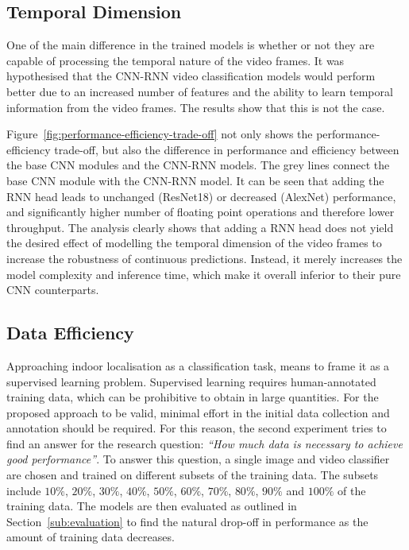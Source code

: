 \documentclass[a4paper]{article}
\begin{document}
  

  \subsection{Temporal Dimension} %
  \label{sub:Temporal Dimension}

  One of the main difference in the trained models is whether or not they are
  capable of processing the temporal nature of the video frames. It was
  hypothesised that the CNN-RNN video classification models would perform better
  due to an increased number of features and the ability to learn temporal
  information from the video frames. The results show that this is not the case.

  Figure~\ref{fig:performance-efficiency-trade-off} not only shows the
  performance-efficiency trade-off, but also the difference in performance and
  efficiency between the base CNN modules and the CNN-RNN models. The grey lines
  connect the base CNN module with the CNN-RNN model. It can be seen that adding
  the RNN head leads to unchanged (ResNet18) or decreased (AlexNet) performance,
  and significantly higher number of floating point operations and therefore
  lower throughput. The analysis clearly shows that adding a RNN head does not
  yield the desired effect of modelling the temporal dimension of the video
  frames to increase the robustness of continuous predictions. Instead, it
  merely increases the model complexity and inference time, which make it
  overall inferior to their pure CNN counterparts.

  \subsection{Data Efficiency} %
  \label{sub:Data Efficiency}

  Approaching indoor localisation as a classification task, means to frame it as
  a supervised learning problem. Supervised learning requires human-annotated
  training data, which can be prohibitive to obtain in large quantities. For the
  proposed approach to be valid, minimal effort in the initial data collection
  and annotation should be required. For this reason, the second experiment
  tries to find an answer for the research question: \textit{ ``How much data
  is necessary to achieve good performance''}. To answer this question, a single
  image and video classifier are chosen and trained on different subsets of the 
  training data. The subsets include $10\%$, $20\%$, $30\%$, $40\%$, $50\%$,
  $60\%$, $70\%$, $80\%$, $90\%$ and $100\%$ of the training data. The models 
  are then evaluated as outlined in Section~\ref{sub:evaluation} to find the
  natural drop-off in performance as the amount of training data decreases.
\end{document}
